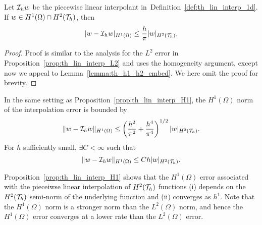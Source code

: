 \begin{proposition}
  \label{prop:th_lin_interp_H1}
    Let $\mathcal{I}_h w$ be the piecewise linear interpolant in~Definition~\ref{def:th_lin_interp_1d}. If $w \in H^1(\Omega) \cap H^2(\mathcal{T}_h)$, then
  \begin{equation*}
    | w - \mathcal{I}_h w |_{H^1(\Omega)}
    \leq \frac{h}{\pi} | w |_{H^2(\mathcal{T}_h)},
  \end{equation*}
  \begin{proof}
    Proof is similar to the analysis for the $L^2$ error in Proposition~\ref{prop:th_lin_interp_L2} and uses the homogeneity argument, except now we appeal to Lemma~\ref{lemma:th_h1_h2_embed}. We here omit the proof for brevity.
  \end{proof}
\end{proposition}
\begin{corollary}
  In the same setting as Proposition~\ref{prop:th_lin_interp_H1}, the $H^1(\Omega)$ norm of the interpolation error is bounded by
  \begin{equation*}
    \|w - \mathcal{I}_h w \|_{H^1(\Omega)} \leq  \left(  \frac{h^2}{\pi^2} +  \frac{h^4}{\pi^4} \right)^{1/2} | w |_{H^2(\mathcal{T}_h)}.
  \end{equation*}
  For $h$ sufficiently small, $\exists C < \infty$ such that
  \begin{equation*}
    \|w - \mathcal{I}_h w \|_{H^1(\Omega)} \leq  C h | w |_{H^2(\mathcal{T}_h)}.
  \end{equation*}
\end{corollary}
Proposition~\ref{prop:th_lin_interp_H1} shows that the $H^1(\Omega)$ error associated with the pieceiwse linear interpolation of $H^2(\mathcal{T}_h)$ functions (i) depends on the $H^2(\mathcal{T}_h)$ semi-norm of the underlying function and (ii) converges as $h^1$. Note that the $H^1(\Omega)$ norm is a stronger norm than the $L^2(\Omega)$ norm, and hence the $H^1(\Omega)$ error converges at a lower rate than the $L^2(\Omega)$ error.

